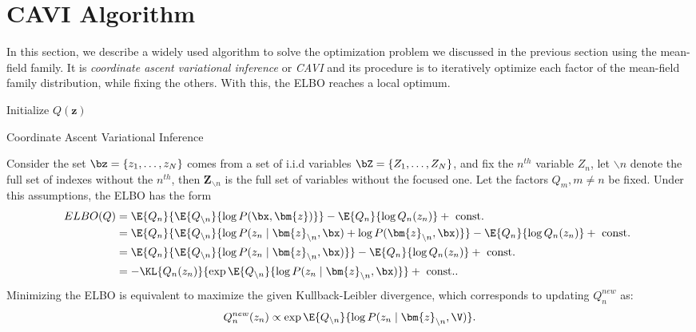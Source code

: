 \section{CAVI Algorithm }

In this section, we describe a widely used algorithm to solve the optimization problem we discussed in the previous section using the mean-field family. It is \emph{coordinate ascent variational inference} or \emph{CAVI} and its procedure is to iteratively optimize each factor of the mean-field family distribution, while fixing the others. With this, the ELBO reaches a local optimum.

 \begin{algorithm}[t]
  \SetAlgoLined
  Initialize \(Q(\bm{z})\)\;
  \;
  \caption{Coordinate Ascent Variational Inference}
  \label{alg:cavi}
\end{algorithm}

Consider the set \(\bz = \{z_1,\dots,z_N\}\) comes from a set of i.i.d variables \(\bZ = \{Z_1,\dots,Z_N\}\), and fix the \(n^{th}\) variable \(Z_{n}\), let \(\backslash n\) denote the full set of indexes without the \(n^{th}\), then \(\bm{Z}_{\backslash n}\) is the full set of variables without the focused one. Let the factors \(Q_{m}, m\neq n\) be fixed. Under this assumptions, the ELBO has the form
\[
  \begin{aligned}
    ELBO(Q) &= \E{Q_{n}}{\E{Q_{\backslash n}}{\log{P(\bx, \bm{z})}}} - \E{Q_{n}}{\log{Q_{n}(z_{n})}} + \text{ const. }\\
    &= \E{Q_{n}}{\E{Q_{\backslash n}}{\log{P(z_{n} \mid \bm{z}_{\backslash n}, \bx)} + \log{P(\bm{z}_{\backslash n}, \bx)}}} - \E{Q_{n}}{\log{Q_{n}(z_{n})}} + \text{ const. }\\
    &=  \E{Q_{n}}{\E{Q_{\backslash n}}{\log{P(z_{n} \mid \bm{z}_{\backslash n}, \bx)}}} - \E{Q_{n}}{\log{Q_{n}(z_{n})}} + \text{ const. }\\
    &= - \KL{Q_{n}(z_{n})}{  \exp{\E{Q_{\backslash n}}{\log{P(z_{n} \mid \bm{z}_{\backslash n}, \bx)}}} } + \text{ const.}.
  \end{aligned}
\]
Minimizing the ELBO is equivalent to maximize the given Kullback-Leibler divergence, which corresponds to updating \(Q_{n}^{new}\) as:
\[
  Q_{n}^{new}(z_{n}) \propto \exp{\E{Q_{\backslash n}}{\log{P(z_{n} \mid \bm{z}_{\backslash n}, \V)}}}.
\]

